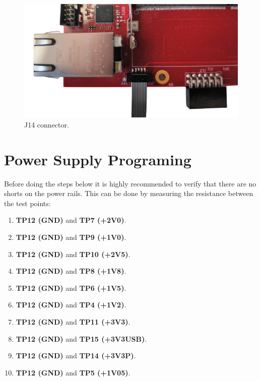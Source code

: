 \documentclass[12pt,oneside,a4]{article}
\begin{document}
\begin{figure}[H]
\begin{center}
\includegraphics[width=0.8\linewidth]{mmcjtag.png}
 \caption{J14 connector. }\label{23}
\end{center}
\end{figure}



\section{Power Supply Programing}
Before doing the steps below it is highly recommended to verify that there are no shorts on the power rails. This can be done by measuring the resistance between the test points:

\begin{enumerate}
    \item \textbf{TP12 (GND)} and \textbf{TP7 (+2V0)}.
    \item \textbf{TP12 (GND)} and \textbf{TP9 (+1V0)}.
    \item \textbf{TP12 (GND)} and \textbf{TP10 (+2V5)}.
    \item \textbf{TP12 (GND)} and \textbf{TP8 (+1V8)}.
    \item \textbf{TP12 (GND)} and \textbf{TP6 (+1V5)}.
    \item \textbf{TP12 (GND)} and \textbf{TP4 (+1V2)}.
    \item \textbf{TP12 (GND)} and \textbf{TP11 (+3V3)}.
    \item \textbf{TP12 (GND)} and \textbf{TP15 (+3V3USB)}.
    \item \textbf{TP12 (GND)} and \textbf{TP14 (+3V3P)}.
    \item \textbf{TP12 (GND)} and \textbf{TP5 (+1V05)}.
\end{enumerate}
\end{document}

